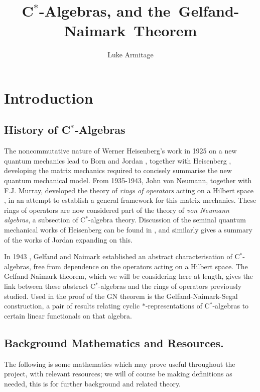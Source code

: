 \documentclass[12pt,a4paper]{amsart}
\author{Luke Armitage}
\title{C$^\ast$-Algebras, and the~Gelfand-Naimark~Theorem}
\theoremstyle{plain}
\theoremstyle{definition}
\begin{document}
\maketitle

\section{Introduction}
\subsection{History of C$^\ast$-Algebras}
	The noncommutative nature of Werner Heisenberg's work in 1925 on a new quantum mechanics \cite{heisenberg25} lead to Born and Jordan \cite{bornjordan25}, together with Heisenberg \cite{bornjordanheisenberg25}, developing the matrix mechanics required to concisely summarise the new quantum mechanical model. 
	From 1935-1943, John von Neumann, together with F.J. Murray, developed the theory of \emph{rings of operators} acting on a Hilbert space \cite{vonneumann35,vonneumann37,vonneumann43,vonneumann40}, in an attempt to establish a general framework for this matrix mechanics.
	These rings of operators are now considered part of the theory of \emph{von Neumann algebras}, a subsection of C$^\ast$-algebra theory. 
	Discussion of the seminal quantum mechanical works of Heisenberg can be found in \cite{mackinnon77}, and similarly \cite{schroer03} gives a summary of the works of Jordan expanding on this.
	
	In 1943 \cite{gelfand43}, Gelfand and Naimark established an abstract characterisation of C$^\ast$-algebras, free from dependence on the operators acting on a Hilbert space.
	The Gelfand-Naimark theorem, which we will be considering here at length, gives the link between these abstract C$^\ast$-algebras and the rings of operators previously studied.
	Used in the proof of the GN theorem is the Gelfand-Naimark-Segal construction, a pair of results relating cyclic $\ast$-representations of C$^\ast$-algebras to certain linear functionals on that algebra. 
	
	
\subsection{Background Mathematics and Resources.}	
	The following is some mathematics which may prove useful throughout the project, with relevant resources; we will of course be making definitions as needed, this is for further background and related theory.
\end{document}
